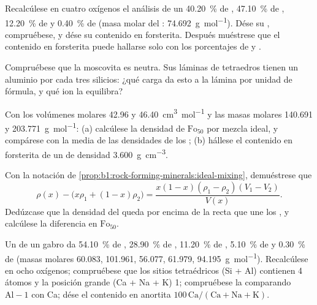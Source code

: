 \begin{exercise}[$\star\star$]\label{exo:b1:rock-forming-minerals:7}
Recalcúlese en cuatro oxígenos el análisis de un  \qty{40.20}{\percent} de ,
\qty{47.10}{\percent} de , \qty{12.20}{\percent} de  y \qty{0.40}{\percent} de 
(masa molar del : \qty{74.692}{g.mol^{-1}}). Dése su , compruébese, y dése su
contenido en forsterita. Después muéstrese que el contenido en forsterita puede hallarse solo con los
porcentajes de  y .
\end{exercise}

\begin{exercise}[$\star\star$]\label{exo:b1:rock-forming-minerals:8}
Compruébese que la moscovita  es neutra. Sus láminas de tetraedros tienen un
aluminio por cada tres silicios: ¿qué carga da esto a la lámina por unidad de fórmula, y qué ion la equilibra?
\end{exercise}

\begin{exercise}[$\star\star$]\label{exo:b1:rock-forming-minerals:9}
Con los volúmenes molares \num{42.96} y \qty{46.40}{cm^3.mol^{-1}} y las masas molares \num{140.691} y
\qty{203.771}{g.mol^{-1}}: (a) calcúlese la densidad de $\text{Fo}_{50}$ por mezcla ideal, y compárese con la
media de las densidades de los ; (b) hállese el contenido en forsterita de un  de
densidad \qty{3.600}{g.cm^{-3}}.
\end{exercise}

\begin{exercise}[$\star\star\star$]\label{exo:b1:rock-forming-minerals:10}
Con la notación de \cref{prop:b1:rock-forming-minerals:ideal-mixing}, demuéstrese que
\[
  \rho(x) - \bigl(x\rho_1 + (1 - x)\rho_2\bigr) =
  \frac{x(1 - x)(\rho_1 - \rho_2)(V_1 - V_2)}{V(x)} .
\]
Dedúzcase que la densidad del  queda por encima de la recta que une los , y calcúlese
la diferencia en $\text{Fo}_{50}$.
\end{exercise}

\begin{exercise}[$\star\star\star$]\label{exo:b1:rock-forming-minerals:11}
Un  de un gabro da \qty{54.10}{\percent} de , \qty{28.90}{\percent} de ,
\qty{11.20}{\percent} de , \qty{5.10}{\percent} de  y \qty{0.30}{\percent} de  (masas
molares \num{60.083}, \num{101.961}, \num{56.077}, \num{61.979}, \qty{94.195}{g.mol^{-1}}). Recalcúlese en
ocho oxígenos; compruébese que los sitios tetraédricos (Si + Al) contienen 4 átomos y la posición grande
(Ca + Na + K) 1; compruébese la  comparando $\mathrm{Al} - 1$ con Ca; dése el contenido en
anortita $100\,\mathrm{Ca}/(\mathrm{Ca} +
\mathrm{Na} + \mathrm{K})$.
\end{exercise}

